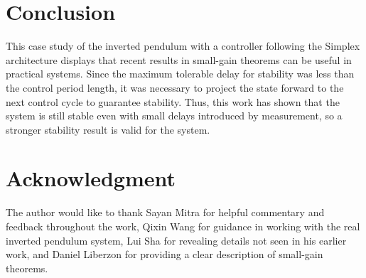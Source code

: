\documentclass[conference]{IEEEtran}
\begin{document}
\section{Conclusion}
This case study of the inverted pendulum with a controller following the Simplex architecture displays that recent results in small-gain theorems can be useful in practical systems.  Since the maximum tolerable delay for stability was less than the control period length, it was necessary to project the state forward to the next control cycle to guarantee stability.  Thus, this work has shown that the system is still stable even with small delays introduced by measurement, so a stronger stability result is valid for the system.


\section*{Acknowledgment}
The author would like to thank Sayan Mitra for helpful commentary and feedback throughout the work, Qixin Wang for guidance in working with the real inverted pendulum system, Lui Sha for revealing details not seen in his earlier work, and Daniel Liberzon for providing a clear description of small-gain theorems.






%






\end{document}

